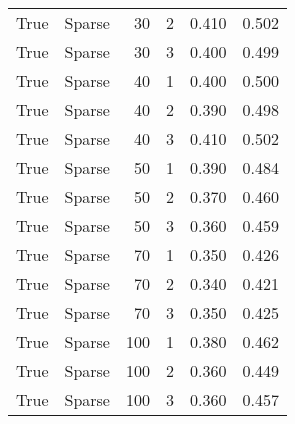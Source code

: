 \begin{tabular}{rlrrrr}
True & Sparse & 30 & 2 & 0.410 & 0.502 \\
True & Sparse & 30 & 3 & 0.400 & 0.499 \\
True & Sparse & 40 & 1 & 0.400 & 0.500 \\
True & Sparse & 40 & 2 & 0.390 & 0.498 \\
True & Sparse & 40 & 3 & 0.410 & 0.502 \\
True & Sparse & 50 & 1 & 0.390 & 0.484 \\
True & Sparse & 50 & 2 & 0.370 & 0.460 \\
True & Sparse & 50 & 3 & 0.360 & 0.459 \\
True & Sparse & 70 & 1 & 0.350 & 0.426 \\
True & Sparse & 70 & 2 & 0.340 & 0.421 \\
True & Sparse & 70 & 3 & 0.350 & 0.425 \\
True & Sparse & 100 & 1 & 0.380 & 0.462 \\
True & Sparse & 100 & 2 & 0.360 & 0.449 \\
True & Sparse & 100 & 3 & 0.360 & 0.457 \\
\bottomrule
\end{tabular}
